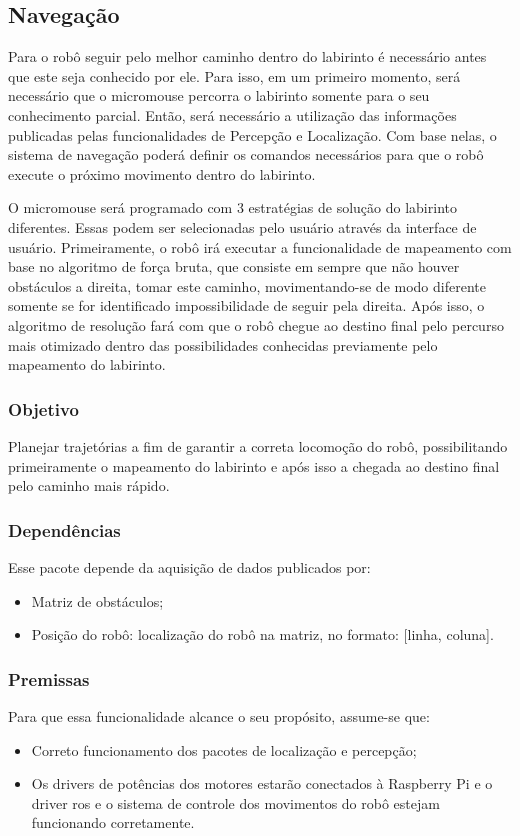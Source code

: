 \subsection{Navegação}
\label{ssec:funcionalidade_navegacao} 
Para o robô seguir pelo melhor caminho dentro do labirinto é necessário antes que este seja conhecido por ele. Para isso, em um primeiro momento, será necessário que o micromouse percorra o labirinto somente para o seu conhecimento parcial. Então, será necessário a utilização das informações publicadas pelas funcionalidades de Percepção e Localização. Com base nelas, o sistema de navegação poderá definir os comandos necessários para que o robô execute o próximo movimento dentro do labirinto.

O micromouse será programado com 3 estratégias de solução do labirinto diferentes. Essas podem ser selecionadas pelo usuário através da interface de usuário. Primeiramente, o robô irá executar a funcionalidade de mapeamento com base no algoritmo de força bruta, que consiste em sempre que não houver obstáculos a direita, tomar este caminho, movimentando-se de modo diferente somente se for identificado impossibilidade de seguir pela direita. Após isso, o algoritmo de resolução fará com que o robô chegue ao destino final pelo percurso mais otimizado dentro das possibilidades conhecidas previamente pelo mapeamento do labirinto.

\subsubsection{Objetivo}
Planejar trajetórias a fim de garantir a correta locomoção do robô, possibilitando primeiramente o mapeamento do labirinto e após isso a chegada ao destino final pelo caminho mais rápido.

\subsubsection{Dependências}
Esse pacote depende da aquisição de dados publicados por:
\begin{itemize}
	\item Matriz de obstáculos;
	\item Posição do robô: localização do robô na matriz, no formato: [linha, coluna].
\end{itemize}

\subsubsection{Premissas}
Para que essa funcionalidade alcance o seu propósito, assume-se que:
\begin{itemize}
	\item Correto funcionamento dos pacotes de localização e percepção;
	\item Os drivers de potências dos motores estarão conectados à Raspberry Pi e o driver \gls*{ros} e o sistema de controle dos movimentos do robô estejam funcionando corretamente.
\end{itemize}

